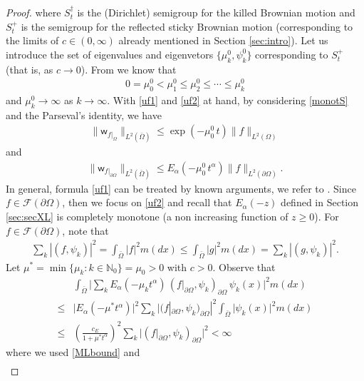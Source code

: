 \documentclass[11pt,a4paper]{article}
\newcommand{\magenta}{black}
\begin{document}
\begin{proof}
where $S^\dagger_t$ is the (Dirichlet) semigroup for the killed Brownian motion and $S^+_t$ is the semigroup for the reflected sticky Brownian motion (corresponding to the limits of $c \in (0, \infty)$ already mentioned in Section \ref{sec:intro}). Let us introduce the set of eigenvalues and eigenvetors $\{\mu^0_k, \psi^0_k \}$ corresponding to $S^+_t$ (that is, as $c\to 0$). From \cite[Theorem 3.1]{vBelFra} we know that 
\begin{align*}
0 = \mu^0_0 < \mu^0_1 \leq \mu^0_2 \leq \cdots \leq \mu^0_k
\end{align*}
and $\mu_k^0 \to \infty$ as $k \to \infty$. With \eqref{uf1} and \eqref{uf2} at hand, by considering \eqref{monotS} and the Parseval's identity, we have
\begin{align*}
\| \mathsf{w}_{f|_{\Omega}} \|_{L^2(\bar{\Omega})} \leq \exp \left(-\mu_0^0\, t \right)  \| f \|_{L^2(\Omega)} 
\end{align*}
and
\begin{align*}
\| \mathsf{w}_{f|_{\partial \Omega}} \|_{L^2(\bar{\Omega})} \leq E_\alpha(-\mu_0^0\, t^\alpha) \| f\|_{L^2(\partial \Omega)}.
\end{align*}
In general, formula \eqref{uf1} can be treated by known arguments, we refer to \cite{BvonBR06}. Since $f \in \mathcal{F}(\partial \Omega)$, then we focus on \eqref{uf2} and recall that $E_\alpha(-z)$ defined in Section \ref{sec:secXL} is completely monotone (a non increasing function of $z\geq 0$). For $f\in \mathcal{F}(\partial \Omega)$, note that
\begin{align}
\sum_k |(f, \psi_k)|^2 = \int_{\bar{\Omega}} |f|^2 m(dx) \leq   \int_{\bar{\Omega}} |g|^2 m(dx) = \sum_k |(g, \psi_k)|^2.
\label{fFourier}
\end{align}
Let {\color{\magenta} $\mu^* = \min \{\mu_k : k \in \mathbb{N}_0 \}=\mu_0>0$} with $c>0$. Observe that 
\begin{align*}
& \int_{\bar{\Omega}} \Big| \sum_{k} E_\alpha(-\mu_k t^\alpha)\, (f|_{\partial \Omega}, \psi_k)_{\partial \Omega}\, \psi_k(x) \Big|^2 m(dx) \\
\leq &  \big|E_\alpha(-\mu^* t^\alpha)\big|^2 \sum_{k} \big| (f|_{\partial \Omega}, \psi_k)_{\partial \Omega}|^2 \int_{\bar{\Omega}} |\psi_k(x) \big|^2 m(dx) \\
\leq &  \left(\frac{c_E}{1+ \mu^* t^\alpha}\right)^2 \sum_{k} \big| (f|_{\partial \Omega}, \psi_k)_{\partial \Omega} \big|^2 < \infty
\end{align*}
where we used \eqref{MLbound} and
\begin{align}

\end{align}
\end{proof}
\end{document}
